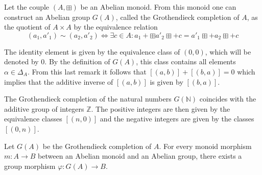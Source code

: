         
        \begin{construct}\label{group:grothendieck_completion}
		Let the couple $(A, \boxplus )$ be an Abelian monoid. From this monoid one can construct an Abelian group $G(A)$, called the Grothendieck completion of $A$, as the quotient of $A\times A$ by the equivalence relation
		\begin{equation}
			(a_1, a'_1)\sim (a_2, a'_2) \iff \exists c\in A: a_1 +\boxplus  a'_2 \boxplus + c = a'_1 \boxplus + a_2 \boxplus + c
		\end{equation}
		
		The identity element is given by the equivalence class of $(0, 0)$, which will be denoted by 0. By the definition of $G(A)$, this class contains all elements $\alpha\in\Delta_A$. From this last remark it follows that $[(a, b)] + [(b, a)] = 0$ which implies that the additive inverse of $[(a, b)]$ is given by $[(b, a)]$.
        \end{construct}
        
        \begin{example}
        	The Grothendieck completion of the natural numbers $G(\mathbb{N})$ coincides with the additive group of integers $\mathbb{Z}$. The positive integers are then given by the equivalence classes $[(n, 0)]$ and the negative integers are given by the classes $[(0, n)]$.
        \end{example}
        
        \begin{uproperty}
        	Let $G(A)$ be the Grothendieck completion of $A$. For every monoid morphism $m:A\rightarrow B$ between an Abelian monoid and an Abelian group, there exists a group morphism $\varphi:G(A)\rightarrow B$.
        \end{uproperty}
        

